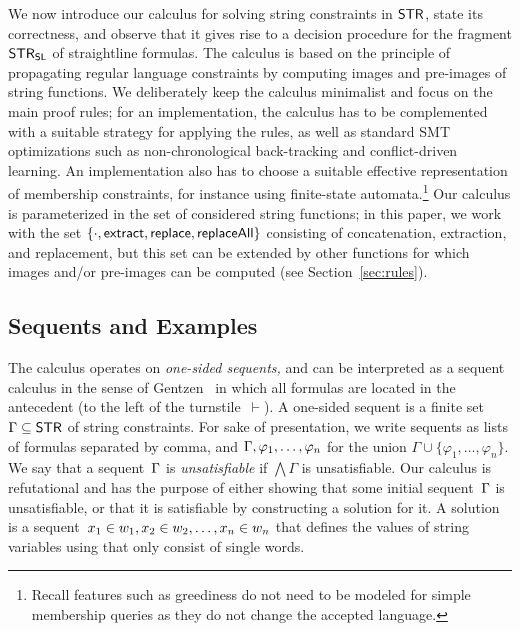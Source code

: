 We now introduce our calculus for solving string constraints in
$\mathsf{STR}$, state its correctness, and observe that it gives rise to a
decision procedure for the fragment $\mathsf{STR}_{\mathsf{SL}}$ of straightline
formulas. The calculus is based on the principle of propagating
regular language constraints by computing images and pre-images of
string functions. We deliberately keep the calculus minimalist and
focus on the main proof rules; for an implementation, the calculus has
to be complemented with a suitable strategy for applying the rules, as
well as standard SMT optimizations such as non-chronological
back-tracking and conflict-driven learning. An implementation also has
to choose a suitable effective representation of \regexp{}
membership constraints, for instance using finite-state automata.\footnote{
    Recall features such as greediness do not need to be modeled for simple membership queries as they do not change the accepted language.
}
%
Our calculus is parameterized in the set of considered string
functions; in this paper, we work with the set
$\{\cdot, \mathsf{extract}, \mathsf{replace}, \mathsf{replaceAll}\}$ consisting of
concatenation, extraction, and replacement, but this set can be
extended by other functions for which images and/or pre-images can be
computed (see Section~\ref{sec:rules}).

\subsection{Sequents and Examples}

The calculus operates on \emph{one-sided sequents,} and can be
interpreted as a sequent calculus in the sense of
Gentzen~\cite{Gentzen35} in which all formulas are located in the
antecedent (to the left of the turnstile~$\vdash$). A one-sided sequent is a
finite set $\Gamma \subseteq \mathsf{STR}$ of string constraints. For sake
of presentation, we write sequents as lists of formulas separated by
comma, and $\seqq{\varphi_1, \ldots, \varphi_n}$ for the union
$\Gamma \cup \{\varphi_1, \ldots, \varphi_n\}$. We say that a
sequent~$\seqq{}$ is \emph{unsatisfiable} if $\bigwedge \Gamma$ is
unsatisfiable. Our calculus is refutational and has the purpose of
either showing that some initial sequent~$\seqq{}$ is unsatisfiable,
or that it is satisfiable by constructing a solution for it. A
solution is a
sequent~$x_1 \in w_1, x_2 \in w_2, \ldots, x_n \in w_n$ that
defines the values of string variables using \regexps{} that only consist
of single words.


